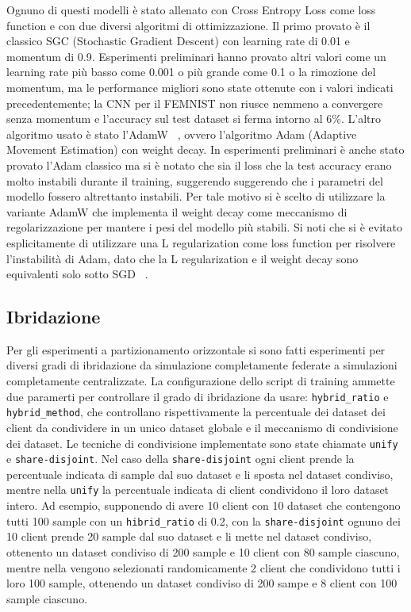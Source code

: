 Ognuno di questi modelli è stato allenato con Cross Entropy Loss
come loss function e con due diversi algoritmi di 
ottimizzazione.
Il primo provato è il classico SGC (Stochastic Gradient
Descent) con learning rate di 0.01 e momentum di 0.9. Esperimenti
preliminari hanno provato altri valori come un learning rate più basso
come 0.001 o più grande come 0.1 o la rimozione del momentum, ma le 
performance migliori sono state ottenute con i valori indicati 
precedentemente; la CNN per il FEMNIST non riusce nemmeno a convergere 
senza momentum e l'accuracy sul test dataset si ferma intorno al 6\%.
L'altro algoritmo usato è stato l'AdamW ~\cite{Loshchilov2017AdamW}, 
ovvero l'algoritmo Adam (Adaptive Movement Estimation) con weight 
decay. In esperimenti preliminari è anche stato provato l'Adam classico 
ma si è notato che sia il loss che la test accuracy erano molto 
instabili durante il training, suggerendo suggerendo che i parametri 
del modello fossero altrettanto instabili. Per tale motivo si è 
scelto di utilizzare la variante AdamW che implementa il weight decay 
come meccanismo di regolarizzazione per mantere i pesi del modello più
stabili. Si noti che si è evitato esplicitamente di utilizzare una 
L regularization come loss function per risolvere l'instabilità 
di Adam, dato che la L regularization e il weight decay sono 
equivalenti solo sotto SGD ~\cite{Loshchilov2017AdamW}.

\subsection{Ibridazione}
Per gli esperimenti a partizionamento orizzontale si sono fatti 
esperimenti per diversi gradi di ibridazione da simulazione completamente
federate a simulazioni completamente centralizzate. La configurazione 
dello script di training ammette due paramerti per controllare il grado 
di ibridazione da usare: \texttt{hybrid\_ratio} e 
\texttt{hybrid\_method}, che controllano
rispettivamente la percentuale dei dataset dei client da condividere in 
un unico dataset globale e il meccanismo di condivisione dei dataset.
Le tecniche di condivisione implementate sono state chiamate \texttt{unify}
e \texttt{share-disjoint}. Nel caso della \texttt{share-disjoint} ogni
client 
prende la percentuale indicata di sample dal suo dataset e li sposta
nel dataset condiviso, mentre nella \texttt{unify} la percentuale 
indicata di 
client condividono il loro dataset intero. Ad esempio, supponendo di 
avere 10 client con 10 dataset che contengono tutti 100 sample con un 
\texttt{hibrid\_ratio} di 0.2, con la \texttt{share-disjoint} ognuno 
dei 10 client prende
20 sample dal suo dataset e li mette nel dataset condiviso, ottenento 
un dataset condiviso di 200 sample e 10 client con 80 sample ciascuno,
mentre nella  vengono selezionati randomicamente 2 client che 
condividono tutti i loro 100 sample, ottenendo un dataset condiviso di 
200 sampe e 8 client con 100 sample ciascuno.

